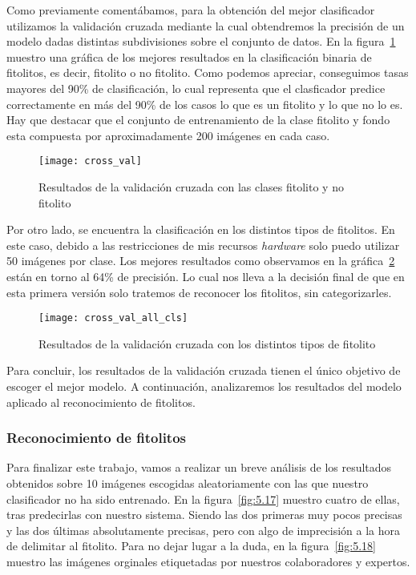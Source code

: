 Como previamente comentábamos, para la obtención del mejor clasificador utilizamos la validación cruzada mediante la cual obtendremos la precisión de un modelo dadas distintas subdivisiones sobre el conjunto de datos. En la figura~\ref{fig:cross_val} muestro una gráfica de los mejores resultados en la clasificación binaria de fitolitos, es decir, fitolito o no fitolito. Como podemos apreciar, conseguimos tasas mayores del 90\% de clasificación, lo cual representa que el clasficador predice correctamente en más del 90\% de los casos lo que es un fitolito y lo que no lo es. Hay que destacar que el conjunto de entrenamiento de la clase fitolito y fondo esta compuesta por aproximadamente 200 imágenes en cada caso. 

\begin{figure}
\centering
\texttt{[image: cross\_val]}
\caption{Resultados de la validación cruzada con las clases fitolito y no fitolito}
\label{fig:cross_val}
\end{figure}

Por otro lado, se encuentra la clasificación en los distintos tipos de fitolitos. En este caso, debido a las restricciones de mis recursos \textit{hardware} solo puedo utilizar 50 imágenes por clase. Los mejores resultados como observamos en la gráfica~\ref{fig:cross_val_all} están en torno al 64\% de precisión. Lo cual nos lleva a la decisión final de que en esta primera versión solo tratemos de reconocer los fitolitos, sin categorizarles.

\begin{figure}
\centering
\texttt{[image: cross\_val\_all\_cls]}
\caption{Resultados de la validación cruzada con los distintos tipos de fitolito}
\label{fig:cross_val_all}
\end{figure}

Para concluir, los resultados de la validación cruzada tienen el único objetivo de escoger el mejor modelo. A continuación, analizaremos los resultados del modelo aplicado al reconocimiento de fitolitos.

\subsubsection{Reconocimiento de fitolitos}

Para finalizar este trabajo, vamos a realizar un breve análisis de los resultados obtenidos sobre 10 imágenes escogidas aleatoriamente con las que nuestro clasificador no ha sido entrenado. En la figura~\ref{fig:5.17} muestro cuatro de ellas, tras predecirlas con nuestro sistema. Siendo las dos primeras muy pocos precisas y las dos últimas absolutamente precisas, pero con algo de imprecisión a la hora de delimitar al fitolito. Para no dejar lugar a la duda, en la figura~\ref{fig:5.18} muestro las imágenes orginales etiquetadas por nuestros colaboradores y expertos.

